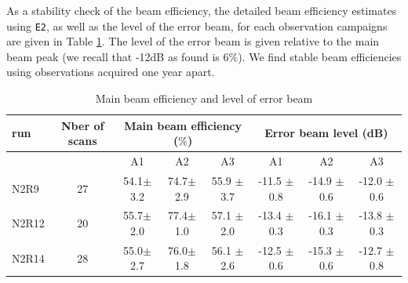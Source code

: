 As a stability check of the beam efficiency, the detailed beam
efficiency estimates using {\tt E2}, as well as the level of
the error beam, for each observation campaigns are given in Table
\ref{tab:MB}. The level of the error beam is given relative to the
main beam peak (we recall that -12dB as found is $6\%$). We find
stable beam efficiencies using observations acquired one year apart.



\begin{table}[!h]
\caption{Main beam efficiency and level of error beam}
\label{tab:MB}
\centering
\begin{tabular}{l| c | c c c | c c c}
\hline\hline
run  & Nber of scans & \multicolumn{3}{|c|}{Main beam efficiency ($\%$)} & \multicolumn{3}{c}{Error beam level (dB)} \\
\hline
     &               &  A1    &    A2   &  A3    & A1  &  A2  & A3   \\
            \hline
N2R9    & 27  &  54.1$\pm$ 3.2   &  74.7$\pm$ 2.9  & 55.9 $\pm$ 3.7   &  -11.5 $\pm$ 0.8    &  -14.9 $\pm$ 0.6   &  -12.0 $\pm$ 0.6   \\
N2R12   & 20  &  55.7$\pm$ 2.0   &  77.4$\pm$ 1.0  & 57.1 $\pm$ 2.0   &  -13.4 $\pm$ 0.3    &  -16.1 $\pm$ 0.3   &  -13.8 $\pm$ 0.3   \\
N2R14   & 28  &  55.0$\pm$ 2.7   &  76.0$\pm$ 1.8  & 56.1 $\pm$ 2.6   &  -12.5 $\pm$ 0.6    &  -15.3 $\pm$ 0.6   &  -12.7 $\pm$ 0.8   \\
            \hline\hline
\end{tabular}
\end{table}

